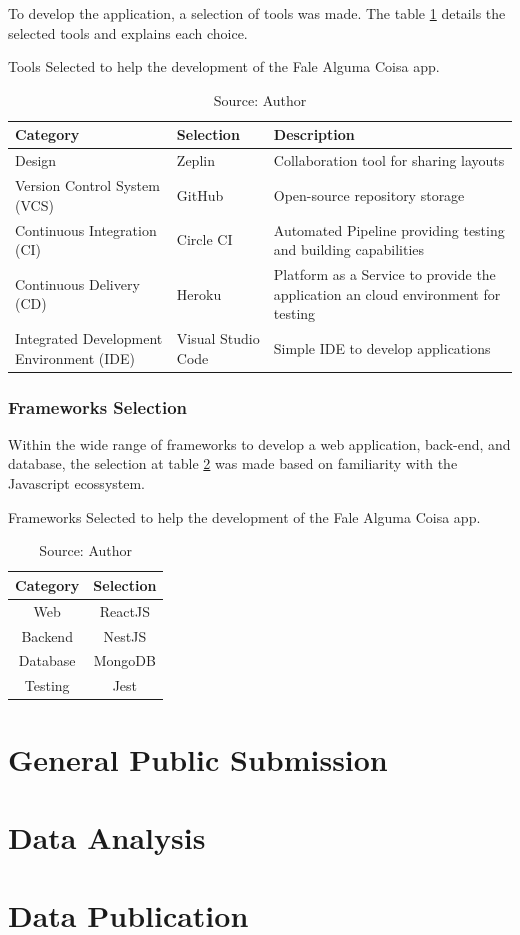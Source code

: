 To develop the application, a selection of tools was made. The table \ref{tab:tools-selection} details the selected tools and explains each choice.

\begin{table}[h]
    \centering
    \caption{Tools Selected to help the development of the Fale Alguma Coisa app.}
    \label{tab:tools-selection}
    \begin{tabular}{|p{5cm}|p{2.5cm}|p{7cm}|}
        \hline Category & Selection & Description \\
        \hline Design & Zeplin & Collaboration tool for sharing layouts \\ 
        \hline Version Control System (VCS) & GitHub & Open-source repository storage \\
        \hline Continuous Integration (CI) & Circle CI & Automated Pipeline providing testing and building capabilities \\ 
        \hline Continuous Delivery (CD) & Heroku & Platform as a Service to provide the application an cloud environment for testing \\ 
        \hline Integrated Development Environment (IDE) & Visual Studio Code & Simple IDE to develop applications \\ \hline 
    \end{tabular}
    \caption*{Source: Author}
\end{table}

\subsubsection{Frameworks Selection}

Within the wide range of frameworks to develop a web application, back-end, and database, the selection at table \ref{tab:frameworks-selection} was made based on familiarity with the Javascript ecossystem.

\begin{table}[h]
    \centering
    \caption{Frameworks Selected to help the development of the Fale Alguma Coisa app.}
    \label{tab:frameworks-selection}
    \begin{tabular}{|c|c|}
        \hline Category & Selection \\
        \hline Web & ReactJS \\ 
        \hline Backend & NestJS \\ 
        \hline Database & MongoDB \\ 
        \hline Testing & Jest \\ \hline 
    \end{tabular}
    \caption*{Source: Author}
\end{table}

\section{General Public Submission}
\label{sec:proposal-public-submission}

\section{Data Analysis}
\label{sec:proposal-data-analysis}

\section{Data Publication}
\label{sec:proposal-data-publication}